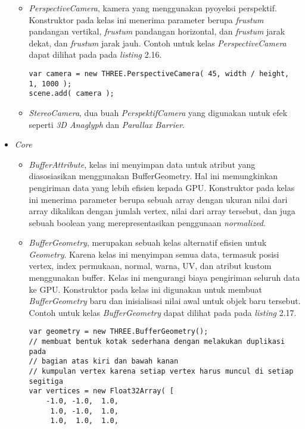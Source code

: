\begin{itemize}
\begin{itemize}
	\item {\it PerspectiveCamera}, kamera yang menggunakan pyoyeksi perspektif. Konstruktor pada kelas ini menerima parameter berupa {\it frustum} pandangan vertikal, {\it frustum} pandangan horizontal, dan {\it frustum} jarak dekat, dan {\it frustum} jarak jauh. Contoh untuk kelas {\it PerspectiveCamera} dapat dilihat pada pada {\it listing} 2.16.
\begin{lstlisting}[caption={Contoh instansiasi kelas {\it PerspectiveCamera}},captionpos=b]
var camera = new THREE.PerspectiveCamera( 45, width / height, 
1, 1000 );
scene.add( camera );
\end{lstlisting}
	
	\item {\it StereoCamera}, dua buah {\it PerspektifCamera} yang digunakan untuk efek seperti {\it 3D Anaglyph} dan {\it Parallax Barrier}.

	\end{itemize}
	
\item \textit{Core}
	\begin{itemize}
	\item{\it BufferAttribute}, kelas ini menyimpan data untuk atribut yang diasosiasikan menggunakan BufferGeometry. Hal ini memungkinkan pengiriman data yang lebih efisien kepada GPU. Konstruktor pada kelas ini menerima parameter berupa sebuah array dengan ukuran nilai dari array dikalikan dengan jumlah vertex, nilai dari array tersebut, dan juga sebuah boolean yang merepresentasikan penggunaan {\it normalized}.
	\item{\it BufferGeometry}, merupakan sebuah kelas alternatif efisien untuk {\it Geometry}. Karena kelas ini menyimpan semua data, termasuk posisi vertex, index permukaan, normal, warna, UV, dan atribut kustom menggunakan buffer. Kelas ini mengurangi biaya pengiriman seluruh data ke GPU. Konstruktor pada kelas ini digunakan untuk membuat {\it BufferGeometry} baru dan inisialisasi nilai awal untuk objek baru tersebut. Contoh untuk kelas {\it BufferGeometry} dapat dilihat pada pada {\it listing} 2.17.
\begin{lstlisting}[caption={Contoh instansiasi kelas {\it BufferGeometry} dengan membuat bentuk kotak sederhana.},captionpos=b]
var geometry = new THREE.BufferGeometry();
// membuat bentuk kotak sederhana dengan melakukan duplikasi pada
// bagian atas kiri dan bawah kanan
// kumpulan vertex karena setiap vertex harus muncul di setiap segitiga
var vertices = new Float32Array( [
	-1.0, -1.0,  1.0,
	 1.0, -1.0,  1.0,
	 1.0,  1.0,  1.0,


\end{lstlisting}
\end{itemize}
\end{itemize}
